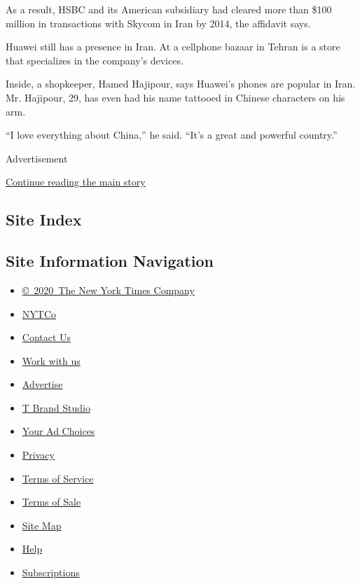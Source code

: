 As a result, HSBC and its American subsidiary had cleared more than
\$100 million in transactions with Skycom in Iran by 2014, the affidavit
says.

Huawei still has a presence in Iran. At a cellphone bazaar in Tehran is
a store that specializes in the company's devices.

Inside, a shopkeeper, Hamed Hajipour, says Huawei's phones are popular
in Iran. Mr. Hajipour, 29, has even had his name tattooed in Chinese
characters on his arm.

``I love everything about China,'' he said. ``It's a great and powerful
country.''

Advertisement

\protect\hyperlink{after-bottom}{Continue reading the main story}

\hypertarget{site-index}{%
\subsection{Site Index}\label{site-index}}

\hypertarget{site-information-navigation}{%
\subsection{Site Information
Navigation}\label{site-information-navigation}}

\begin{itemize}
\tightlist
\item
  \href{https://help.nytimes.com/hc/en-us/articles/115014792127-Copyright-notice}{©~2020~The
  New York Times Company}
\end{itemize}

\begin{itemize}
\tightlist
\item
  \href{https://www.nytco.com/}{NYTCo}
\item
  \href{https://help.nytimes.com/hc/en-us/articles/115015385887-Contact-Us}{Contact
  Us}
\item
  \href{https://www.nytco.com/careers/}{Work with us}
\item
  \href{https://nytmediakit.com/}{Advertise}
\item
  \href{http://www.tbrandstudio.com/}{T Brand Studio}
\item
  \href{https://www.nytimes.com/privacy/cookie-policy\#how-do-i-manage-trackers}{Your
  Ad Choices}
\item
  \href{https://www.nytimes.com/privacy}{Privacy}
\item
  \href{https://help.nytimes.com/hc/en-us/articles/115014893428-Terms-of-service}{Terms
  of Service}
\item
  \href{https://help.nytimes.com/hc/en-us/articles/115014893968-Terms-of-sale}{Terms
  of Sale}
\item
  \href{https://spiderbites.nytimes.com}{Site Map}
\item
  \href{https://help.nytimes.com/hc/en-us}{Help}
\item
  \href{https://www.nytimes.com/subscription?campaignId=37WXW}{Subscriptions}
\end{itemize}
